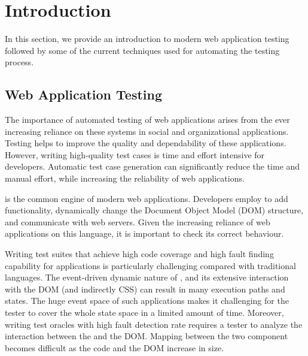 \chapter{Introduction} \label{chap:intro}
In this section, we provide an introduction to modern web application testing followed by some of the current techniques used for automating the testing process.
 
\section{Web Application Testing} \label{Sec:web-testing}
The importance of automated testing of web applications arises from the ever increasing
reliance on these systems in social and organizational
applications. Testing helps to improve the quality and dependability of these applications. However, writing high-quality test cases is time and effort intensive for developers.
Automatic test case generation can significantly reduce the time and manual effort, while
increasing the reliability of web applications.

\javascript is the common engine of modern web applications. 
Developers employ \javascript to add functionality, dynamically change the Document Object Model (DOM) structure,
and communicate with web servers. Given the increasing reliance of web applications on this language, it is important to check its correct behaviour.

Writing test suites that achieve high code coverage and high fault finding capability for \javascript applications is particularly challenging compared with traditional languages.
The event-driven dynamic nature of \javascript, and its extensive interaction with the DOM (and indirectly CSS) can result in many execution paths and states. The huge event space of such applications makes it challenging for the tester to cover the whole state space in a limited amount of time. Moreover, writing test oracles with high fault detection rate requires a tester to analyze the interaction between the \javascript and the DOM. Mapping between the two component becomes difficult as the \javascript code and the DOM increase in size. 

